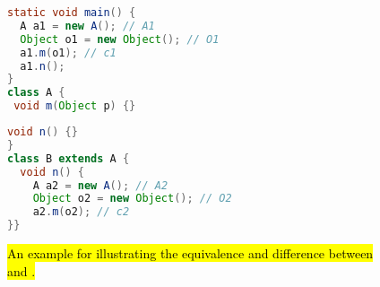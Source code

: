 \begin{figure}
\begin{mdframed}[
align=center,
usetwoside=false,
rightmargin=1cm,
innerleftmargin=1.0ex,
innerrightmargin=-20.0ex
innertopmargin=0.2ex,
innerbottommargin=0.2ex
]

\begin{minipage}{0.4\linewidth}
\begin{lstlisting}[language=java, basicstyle=\linespread{0.8}]
static void main() {
  A a1 = new A(); // A1
  Object o1 = new Object(); // O1
  a1.m(o1); // c1
  a1.n(); 
}
class A {
 void m(Object p) {}
\end{lstlisting}
\end{minipage}
\hspace{-2ex}
\begin{minipage}{0.45\linewidth}
\begin{lstlisting}[language=java, firstnumber=9, basicstyle=\linespread{0.8}]
 void n() {}
}
class B extends A {
  void n() {
    A a2 = new A(); // A2
    Object o2 = new Object(); // O2
    a2.m(o2); // c2
}}
\end{lstlisting}
\end{minipage}
\end{mdframed}
\caption{\hl{An example for illustrating the equivalence and difference between
\LFCR and .}
\label{fig:imprecision-unreachable-code}}
\end{figure}




